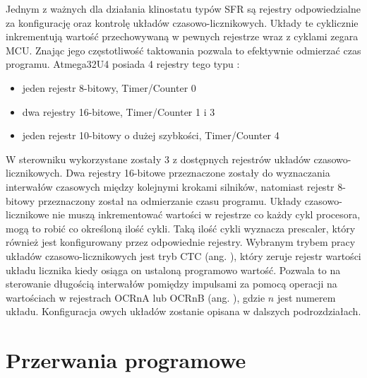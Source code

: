 Jednym z ważnych dla działania klinostatu typów SFR są rejestry odpowiedzialne za konfigurację oraz kontrolę układów czasowo-licznikowych. Układy te cyklicznie inkrementują wartość przechowywaną w pewnych rejestrze wraz z cyklami zegara MCU. Znając jego częstotliwość taktowania pozwala to efektywnie odmierzać czas programu. Atmega32U4 posiada 4 rejestry tego typu \cite{bib:nota_katalogowa}: 
\begin{itemize}
	\item jeden rejestr 8-bitowy, Timer/Counter 0
	\item dwa rejestry 16-bitowe, Timer/Counter 1 i 3
	\item jeden rejestr 10-bitowy o dużej szybkości, Timer/Counter 4
\end{itemize}

W sterowniku wykorzystane zostały 3 z dostępnych rejestrów układów czasowo-licznikowych. Dwa rejestry 16-bitowe przeznaczone zostały do wyznaczania interwałów czasowych między kolejnymi krokami silników, natomiast rejestr 8-bitowy przeznaczony został na odmierzanie czasu programu. Układy czasowo-licznikowe nie muszą inkrementować wartości w rejestrze co każdy cykl procesora, mogą to robić co określoną ilość cykli. Taką ilość cykli wyznacza prescaler, który również jest konfigurowany przez odpowiednie rejestry. Wybranym trybem pracy układów czasowo-licznikowych jest tryb CTC (ang. ), który zeruje rejestr wartości układu licznika kiedy osiąga on ustaloną programowo wartość. Pozwala to na sterowanie długością interwałów pomiędzy impulsami za pomocą operacji na wartościach w  rejestrach OCRnA lub OCRnB (ang. ), gdzie $n$ jest numerem układu. Konfiguracja owych układów zostanie opisana w dalszych podrozdziałach.

\section{Przerwania programowe}

